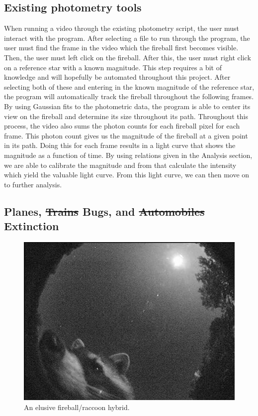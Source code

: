 \subsection{Existing photometry tools}
When running a video through the existing photometry script, the user must interact with the program.
After selecting a file to run through the program, the user must find the frame in the video which the fireball first becomes visible.
Then, the user must left click on the fireball.
After this, the user must right click on a reference star with a known magnitude.
This step requires a bit of knowledge and will hopefully be automated throughout this project.
After selecting both of these and entering in the known magnitude of the reference star, the program will automatically track the fireball throughout the following frames.
By using Gaussian fits to the photometric data, the program is able to center its view on the fireball and determine its size throughout its path.
Throughout this process, the video also sums the photon counts for each fireball pixel for each frame.
This photon count gives us the magnitude of the fireball at a given point in its path.
Doing this for each frame results in a light curve that shows the magnitude as a function of time.  
By using relations given in the Analysis section, we are able to calibrate the magnitude and from that calculate the intensity which yield the valuable light curve.
From this light curve, we can then move on to further analysis.

\subsection{Planes, \st{Trains} Bugs, and \st{Automobiles} Extinction}

\begin{figure}[ht!]
  \centering
  \includegraphics[scale=0.3]{images/racoon_cam.jpg}
  \caption{An elusive fireball/raccoon hybrid.}
  \label{raccoon}
\end{figure}

